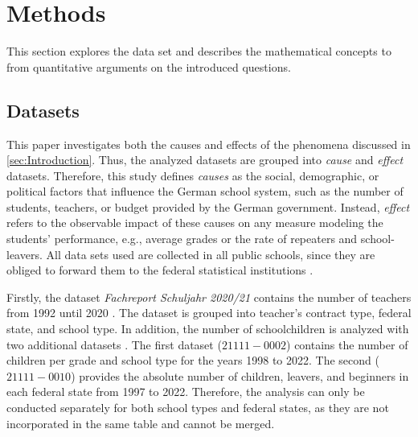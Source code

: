 \section{Methods}
This section explores the data set and describes the mathematical concepts to from quantitative arguments on the introduced questions.



\subsection{Datasets}\label{subsec:datasets}
This paper investigates both the causes and effects of the phenomena discussed in \autoref{sec:Introduction}. Thus, the analyzed datasets are grouped into \emph{cause} and \emph{effect} datasets. Therefore, this study defines \emph{causes} as the social, demographic, or political factors that  influence the German school system, such as the number of students, teachers, or budget provided by the German government. Instead, \emph{effect} refers to the observable impact of these causes on any measure modeling the students' performance, e.g., average grades or the rate of repeaters and school-leavers. All data sets used are collected in all public schools, since they are obliged to forward them to the federal statistical institutions \cite{statistische_bundesamt_statistisches_2024,kultusminister_konferenz_abiturnoten_nodate}.

Firstly, the dataset \textit{Fachreport Schuljahr 2020/21} contains the number of teachers from 1992 until 2020 \cite{statistische_bundesamt_allgemeinbildende_2022}. The dataset is grouped into teacher's contract type, federal state, and school type. In addition, the number of schoolchildren is analyzed with two additional datasets \cite{statistische_bundesamt_statistisches_2024}. The first dataset (\href{https://www-genesis.destatis.de/genesis//online?operation=table&code=21111-0002&bypass=true&levelindex=0&levelid=1706352545984#abreadcrumb}{$21111-0002$}) contains the number of children per grade and school type  for the years 1998 to 2022. The second (\href{https://www-genesis.destatis.de/genesis//online?operation=table&code=21111-0010&bypass=true&levelindex=0&levelid=1706352536762#abreadcrumb}{$21111-0010$}) provides the absolute number of children, leavers, and beginners in each federal state from 1997 to 2022. Therefore, the analysis can only be conducted separately for both school types and federal states, as they are not incorporated in the same table and cannot be merged.

